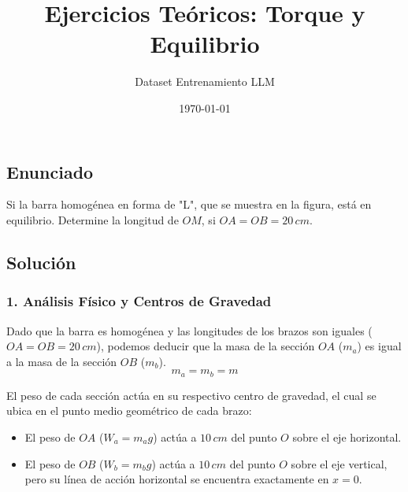 \documentclass[12pt, a4paper]{article}
\title{Ejercicios Teóricos: Torque y Equilibrio}
\author{Dataset Entrenamiento LLM}
\date{\today}
\begin{document}
\maketitle

\subsection*{Enunciado}
Si la barra homogénea en forma de "L", que se muestra en la figura, está en equilibrio. Determine la longitud de $OM$, si $OA = OB = 20 \, \si{cm}$.

\begin{center}
\end{center}

\subsection*{Solución}

\subsubsection*{1. Análisis Físico y Centros de Gravedad}
Dado que la barra es homogénea y las longitudes de los brazos son iguales ($OA = OB = 20 \, \si{cm}$), podemos deducir que la masa de la sección $OA$ ($m_a$) es igual a la masa de la sección $OB$ ($m_b$).
$$m_a = m_b = m$$

El peso de cada sección actúa en su respectivo centro de gravedad, el cual se ubica en el punto medio geométrico de cada brazo:
\begin{itemize}
    \item El peso de $OA$ ($W_a = m_a g$) actúa a $10 \, \si{cm}$ del punto $O$ sobre el eje horizontal.
    \item El peso de $OB$ ($W_b = m_b g$) actúa a $10 \, \si{cm}$ del punto $O$ sobre el eje vertical, pero su línea de acción horizontal se encuentra exactamente en $x = 0$.
\end{itemize}
\end{document}
